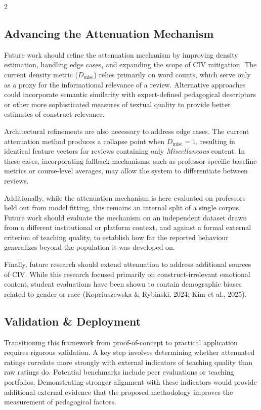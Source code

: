 \documentclass{article}
\begin{document}
\begin{multicols*}{2}
\subsection{Advancing the Attenuation Mechanism}

Future work should refine the attenuation mechanism by improving density estimation, handling edge cases, and expanding the scope of CIV mitigation. The current density metric ($D_{\text{misc}}$) relies primarily on word counts, which serve only as a proxy for the informational relevance of a review. Alternative approaches could incorporate semantic similarity with expert-defined pedagogical descriptors or other more sophisticated measures of textual quality to provide better estimates of construct relevance.

Architectural refinements are also necessary to address edge cases. The current attenuation method produces a collapse point when $D_{\text{misc}} = 1$, resulting in identical feature vectors for reviews containing only \textit{Miscellaneous} content. In these cases, incorporating fallback mechanisms, such as professor-specific baseline metrics or course-level averages, may allow the system to differentiate between reviews.

Additionally, while the attenuation mechanism is here evaluated on professors held out from model fitting, this remains an internal split of a single corpus. Future work should evaluate the mechanism on an independent dataset drawn from a different institutional or platform context, and against a formal external criterion of teaching quality, to establish how far the reported behaviour generalizes beyond the population it was developed on.

Finally, future research should extend attenuation to address additional sources of CIV. While this research focused primarily on construct-irrelevant emotional content, student evaluations have been shown to contain demographic biases related to gender or race (Kopciuszewska \& Rybinski, 2024; Kim et al., 2025). 

\subsection{Validation \& Deployment}
Transitioning this framework from proof-of-concept to practical application requires rigorous validation. A key step involves determining whether attenuated ratings correlate more strongly with external indicators of teaching quality than raw ratings do. Potential benchmarks include peer evaluations or teaching portfolios. Demonstrating stronger alignment with these indicators would provide additional external evidence that the proposed methodology improves the measurement of pedagogical factors.


\end{multicols*}
\end{document}
